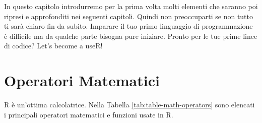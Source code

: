 \documentclass[
]{book}
\begin{document}
In questo capitolo introdurremo per la prima volta molti elementi che saranno poi ripresi e approfonditi nei seguenti capitoli. Quindi non preoccuparti se non tutto ti sarà chiaro fin da subito. Imparare il tuo primo linguaggio di programmazione è difficile ma da qualche parte bisogna pure iniziare. Pronto per le tue prime linee di codice? Let's become a useR!

\hypertarget{math-operators}{%
\section{Operatori Matematici}\label{math-operators}}

R è un'ottima calcolatrice. Nella Tabella \ref{tab:table-math-operators} sono elencati i principali operatori matematici e funzioni usate in R.
\end{document}
